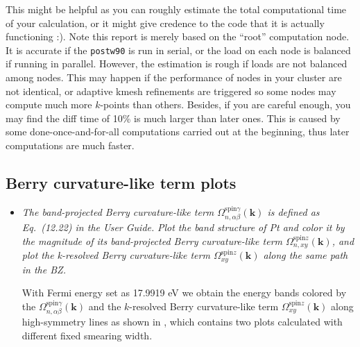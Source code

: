 \begin{itemize}
\begin{tcolorbox}[title=Pt.wpout,sharp corners,boxrule=0.5pt]
{\begin{verbatim}
\end{verbatim}
}
\end{tcolorbox}
This might be helpful as you can roughly
estimate the total computational time
of your calculation, or it might give credence to the code that it is actually functioning :).
Note this report is merely based on the ``root'' computation node. It is accurate if the {\tt postw90} is run in serial, or the load on each node is balanced if running in parallel. However, the estimation is rough if loads are not balanced among nodes. This may happen if the performance of nodes in your cluster are not identical, or adaptive kmesh refinements are triggered so some nodes may compute much more $k$-points than others.
Besides, if you are careful enough, you may find the diff time of 10\% is much larger than later ones. This
is caused by some done-once-and-for-all computations carried out at the beginning, thus
later computations are much faster.
\end{itemize}

\subsection*{Berry curvature-like term plots}
\begin{itemize}
	\item {\it The band-projected Berry curvature-like term $\Omega_{n,\alpha\beta}^{\text{spin} \gamma}({\bm k})$
		is defined as Eq.~(12.22) in the User Guide.}
	{\it Plot the band structure of Pt and color it
		by the magnitude of its band-projected Berry curvature-like term $\Omega_{n,xy}^{\text{spin}z}(\bm k)$,
		and plot the k-resolved Berry curvature-like term $\Omega_{xy}^{\text{spin}z}(\bm k)$ along the
		same path in the BZ. }

	With Fermi energy set as 17.9919 eV we obtain the energy bands colored by the
	$\Omega_{n,\alpha\beta}^{\text{spin} \gamma}({\bm k})$
	and the $k$-resolved Berry curvature-like term
	$\Omega_{xy}^{\text{spin}z}(\bm k)$ along high-symmetry lines
	as shown in , which contains two plots calculated with
	different fixed smearing width.
\end{itemize}

